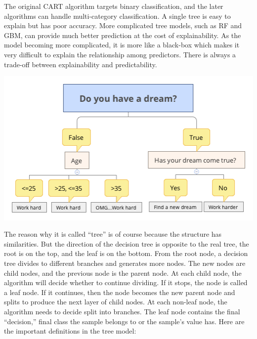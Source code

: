 \documentclass[12pt,]{krantz}
\theoremstyle{definition}
\theoremstyle{definition}
\theoremstyle{definition}
\theoremstyle{remark}
\begin{document}
The original CART algorithm targets binary classification, and the later
algorithms can handle multi-category classification. A single tree is
easy to explain but has poor accuracy. More complicated tree models,
such as RF and GBM, can provide much better prediction at the cost of
explainability. As the model becoming more complicated, it is more like
a black-box which makes it very difficult to explain the relationship
among predictors. There is always a trade-off between explainability and
predictability.

\includegraphics{../linhui.org/book/Figure/treeEN.png}

The reason why it is called ``tree'' is of course because the structure
has similarities. But the direction of the decision tree is opposite to
the real tree, the root is on the top, and the leaf is on the bottom.
From the root node, a decision tree divides to different branches and
generates more nodes. The new nodes are child nodes, and the previous
node is the parent node. At each child node, the algorithm will decide
whether to continue dividing. If it stops, the node is called a leaf
node. If it continues, then the node becomes the new parent node and
splits to produce the next layer of child nodes. At each non-leaf node,
the algorithm needs to decide split into branches. The leaf node
contains the final ``decision,'' final class the sample belongs to or
the sample's value has. Here are the important definitions in the tree
model:
\end{document}
